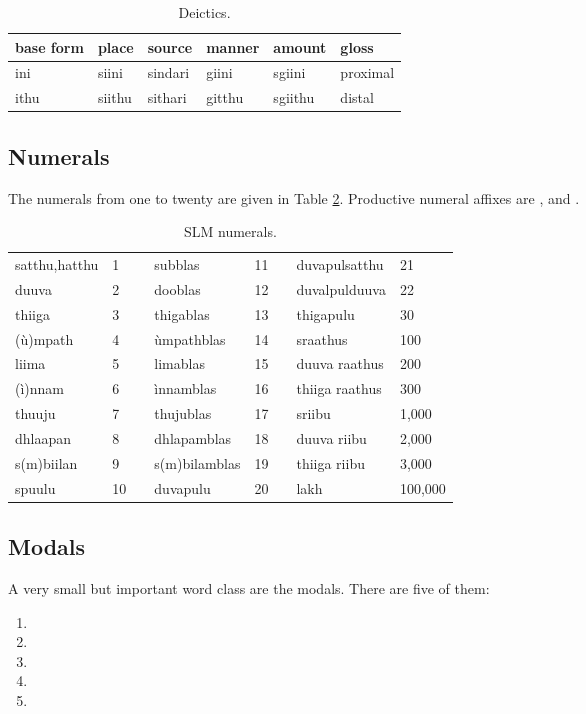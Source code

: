 \begin{table}[p]
\begin{center}
\begin{tabular}{llllll}
base form & place  	& source & manner& amount& gloss \\ %
\hline
ini 	& siini 	& sindari& giini & sgiini & proximal \\ %
ithu 	& siithu 	& sithari& gitthu& sgiithu& distal \\ %
\end{tabular}
\end{center}
\caption{Deictics.}
\label{tab:deictics}
\end{table}

\subsection{Numerals}
The numerals from one to twenty are given in Table \ref{tab:numerals}. Productive numeral affixes are ,  and .

\begin{table}[p]
\begin{center}
\begin{tabular}{llcllcll} 
satthu,hatthu 	& 1 	&& subblas	& 11 	&& duvapulsatthu	& 21\\
duuva         	& 2 	&& dooblas 	& 12 	&& duvalpulduuva 	& 22	\\
thiiga        	& 3 && thigablas 	& 13 	&& thigapulu 	& 30	\\
(ù)mpath 	& 4 	&& ùmpathblas 	& 14 	&& sraathus 	& 100	\\
liima 		& 5 	&& limablas 	& 15 	&& duuva raathus & 200	\\
(ì)nnam		& 6 	&& ìnnamblas 	& 16 	&& thiiga raathus & 300	\\
thuuju 		& 7 && thujublas 	& 17 	&& sriibu 	& 1,000	\\
dhlaapan 	& 8	&& dhlapamblas 	& 18 	&& duuva riibu 	& 2,000	\\
s(m)biilan	& 9 	&& s(m)bilamblas& 19 	&& thiiga riibu 	& 3,000	\\
spuulu 		& 10 	&& duvapulu 	& 20 	&& lakh \phonet{l\ae k} & 100,000
\end{tabular}
\caption{SLM numerals.}
\label{tab:numerals}
\end{center}
\end{table}

\subsection{Modals}
A very small but important word class are the modals. There are five of them:
\begin{enumerate}
 \item {}
 \item {}
 \item {}
 \item {}
 \item {}
\end{enumerate}

